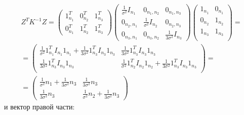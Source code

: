 \begin{multline}
    Z^T K^{-1} Z
    =
    \begin{pmatrix}
        1_{n_1}^T & 0_{n_2}^T & 1_{n_3}^T \\
        0_{n_1}^T & 1_{n_2}^T & 1_{n_3}^T
    \end{pmatrix}
    \begin{pmatrix}
        \frac{1}{\sigma^2} I_{n_1} & 0_{n_1,n_2}                & 0_{n_1,n_3}                  \\
        0_{n_2,n_1}                & \frac{1}{\sigma^2} I_{n_2} & 0_{n_2,n_3}                  \\
        0_{n_3,n_1}                & 0_{n_3,n_2}                & \frac{1}{3 \sigma^2} I_{n_3}
    \end{pmatrix}
    \begin{pmatrix}
        1_{n_1} & 0_{n_1} \\
        0_{n_2} & 1_{n_2} \\
        1_{n_3} & 1_{n_3} \\
    \end{pmatrix} = \\
    = \begin{pmatrix}
          \frac{1}{\sigma^2} 1_{n_1}^T I_{n_1} 1_{n_1} + \frac{1}{3 \sigma^2} 1_{n_3}^T I_{n_3} 1_{n_3} & \frac{1}{3 \sigma^2} 1_{n_3}^T I_{n_3} 1_{n_3} \\
          \frac{1}{3 \sigma^2} 1_{n_3}^T I_{n_3} 1_{n_3}                                                & \frac{1}{\sigma^2} 1_{n_2}^T I_{n_2} 1_{n_2} + \frac{1}{3 \sigma^2} 1_{n_3}^T I_{n_3} 1_{n_3} \\
    \end{pmatrix}
    = \\
    = \begin{pmatrix}
          \frac{1}{\sigma^2} n_1 + \frac{1}{3 \sigma^2} n_3 & \frac{1}{3 \sigma^2} n_3                          \\
          \frac{1}{3 \sigma^2} n_3                          & \frac{1}{\sigma^2} n_2 + \frac{1}{3 \sigma^2} n_3
    \end{pmatrix}
\end{multline}
и вектор правой части:
